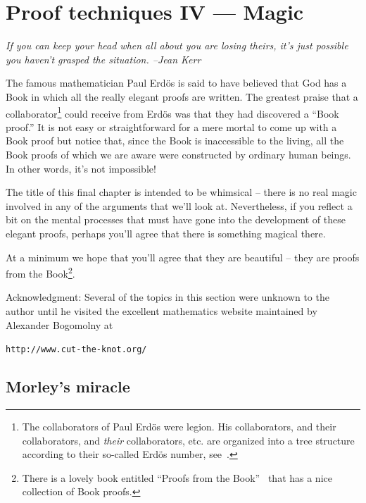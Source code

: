 
\chapter{Proof techniques IV --- Magic}

{\em If you can keep your head when all about you are losing theirs, it's 
just possible you haven't grasped the situation. --Jean Kerr} 

\vspace{.3in}

The famous mathematician 
 Paul Erd\"{o}s is said to have believed that
God has a Book in which all the really elegant proofs are written.
The greatest praise that a collaborator\footnote{The collaborators
of Paul Erd\"{o}s were legion.  His collaborators, and their collaborators,
and \emph{their} collaborators, etc. are organized into a tree structure 
according to their so-called Erd\"{o}s number,
see~\cite{wiki-Erdos_number}.} could receive from Erd\"{o}s
was that they had discovered a ``Book proof.''   It is not
easy or straightforward for a mere mortal to come up with a Book 
proof but notice that, since the Book is inaccessible to the living,
all the Book proofs of which we are aware were constructed by ordinary
human beings.  In other words, it's not impossible!

The title of this final chapter is intended to be whimsical -- there
is no real magic involved in any of the arguments that we'll look at.  
Nevertheless, if you  reflect a bit on the mental processes that 
must have gone into the development of these elegant proofs, perhaps
you'll agree that there is something magical there.   

At a minimum
we hope that you'll agree that they are beautiful -- they are proofs
from the Book\footnote{There is a lovely book entitled ``Proofs from the
Book''~\cite{pftB} that has a nice collection of Book proofs.}.

Acknowledgment: Several of the topics in this section were unknown to
the author until he visited the excellent mathematics website maintained
by Alexander Bogomolny at

\verb+http://www.cut-the-knot.org/+

\clearpage

\section{Morley's miracle}

